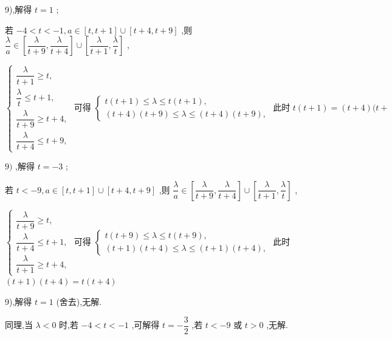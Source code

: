 \documentclass[10pt]{article}
\begin{document}
9),解得 $t = 1$ ;

若 $- 4 < t <  - 1,a \in  \left\lbrack  {t,t + 1}\right\rbrack   \cup  \left\lbrack  {t + 4,t + 9}\right\rbrack$ ,则 $\dfrac{\lambda }{a} \in  \left\lbrack  {\dfrac{\lambda }{t + 9},\dfrac{\lambda }{t + 4}}\right\rbrack   \cup  \left\lbrack  {\dfrac{\lambda }{t + 1},\dfrac{\lambda }{t}}\right\rbrack$ ,

$\left\{  {\begin{array}{l} \dfrac{\lambda }{t + 1} \geq  t, \\  \dfrac{\lambda }{t} \leq  t + 1, \\  \dfrac{\lambda }{t + 9} \geq  t + 4, \\  \dfrac{\lambda }{t + 4} \leq  t + 9, \end{array}\text{ 可得 }\left\{  {\begin{array}{l} t\left( {t + 1}\right)  \leq  \lambda  \leq  t\left( {t + 1}\right) , \\  \left( {t + 4}\right) \left( {t + 9}\right)  \leq  \lambda  \leq  \left( {t + 4}\right) \left( {t + 9}\right) , \end{array}\text{ 此时 }t\left( {t + 1}\right)  = \left( {t + 4}\right) (t + }\right. }\right.$

$9)$ ,解得 $t =  - 3$ ;

若 $t <  - 9,a \in  \left\lbrack  {t,t + 1}\right\rbrack   \cup  \left\lbrack  {t + 4,t + 9}\right\rbrack$ ,则 $\dfrac{\lambda }{a} \in  \left\lbrack  {\dfrac{\lambda }{t + 9},\dfrac{\lambda }{t + 4}}\right\rbrack   \cup  \left\lbrack  {\dfrac{\lambda }{t + 1},\dfrac{\lambda }{t}}\right\rbrack$ ,

$\left\{  \begin{array}{l} \dfrac{\lambda }{t + 9} \geq  t, \\  \dfrac{\lambda }{t + 4} \leq  t + 1, \\  \dfrac{\lambda }{t + 1} \geq  t + 4, \end{array}\right.$ 可得 $\left\{  \begin{array}{l} t\left( {t + 9}\right)  \leq  \lambda  \leq  t\left( {t + 9}\right) , \\  \left( {t + 1}\right) \left( {t + 4}\right)  \leq  \lambda  \leq  \left( {t + 1}\right) \left( {t + 4}\right) , \end{array}\right.$ 此时 $\left( {t + 1}\right) \left( {t + 4}\right)  = t\left( {t + 4}\right)$

9),解得 $t = 1$ (舍去),无解.

同理,当 $\lambda  < 0$ 时,若 $- 4 < t <  - 1$ ,可解得 $t =  - \dfrac{3}{2}$ ,若 $t <  - 9$ 或 $t > 0$ ,无解.
\end{document}
